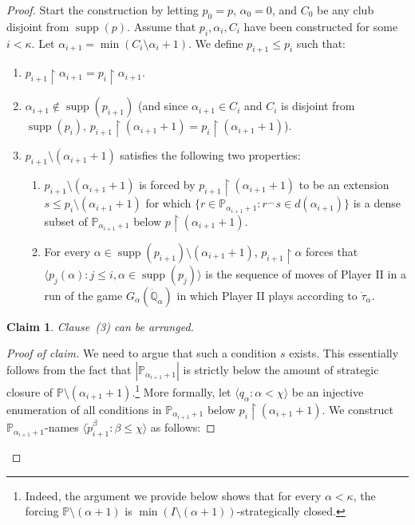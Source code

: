 \documentclass[11pt]{amsart}
\renewcommand{\restriction}{\mathbin\upharpoonright}    %
\newtheorem{claim}{Claim}[theorem]
\theoremstyle{definition}
\newcounter{condition}
\theoremstyle{remark}
\newcommand\<{{<}}
\DeclareMathOperator{\supp}{supp}
\newcommand{\po}{\mathbb{P}}
\newcommand{\qo}{\mathbb{Q}}
\newcommand{\la}{\langle}
\newcommand{\ra}{\rangle}
\begin{document}
\begin{proof}
    Start the construction by letting $p_0 = p$, $\alpha_0 = 0$, and $C_0$ be any club disjoint from $\supp(p)$. Assume that $p_i, \alpha_i, C_i$ have been constructed for some $i<\kappa$. Let $\alpha_{i+1} = \min(C_i \setminus \alpha_i+1)$. We define $p_{i+1}\leq p_i$ such that:
    \begin{enumerate}
        \item $p_{i+1}\restriction \alpha_{i+1} = p_i \restriction \alpha_{i+1}$.
        \item $\alpha_{i+1}\notin \supp(p_{i+1})$ (and since $\alpha_{i+1}\in C_i$ and $C_i$ is disjoint from $\supp(p_i)$,  $p_{i+1}\restriction (\alpha_{i+1}+1) = p_{i}\restriction (\alpha_{i+1}+1)$).
        \item $p_{i+1}\setminus (\alpha_{i+1}+1)$ satisfies the following two properties:
        \begin{enumerate}
            \item $p_{i+1}\setminus (\alpha_{i+1}+1)$ is forced by $p_{i+1}\restriction (\alpha_{i+1}+1)$ to be an  extension $s\leq p_i\setminus (\alpha_{i+1}+1)$ for which $\{ r\in \po_{\alpha_{i+1}+1} \colon  r^{\frown} s\in d(\alpha_{i+1}) \}$ is a dense subset of $\po_{\alpha_{i+1}+1}$ below $p\restriction (\alpha_{i+1}+1)$.
            \item For every $\alpha\in \supp(p_{i+1})\setminus (\alpha_{i+1}+1)$, $p_{i+1}\restriction \alpha$ forces that $\la p_j(\alpha) \colon j\leq i, \alpha\in \supp(p_j) \ra$ is the sequence of moves of Player II in a run of the game $G_\alpha(\dot{\qo}_\alpha)$ in which Player II plays according to $\dot{\tau}_\alpha$.
        \end{enumerate}
    \end{enumerate}
\begin{claim}\label{Claim: fusion lemma, arranging clause 3}
    Clause~(3) can be arranged.
\end{claim}
\begin{proof}[Proof of claim]
   We need to argue that such a condition $s$ exists.  This essentially follows from the fact that $|\po_{\alpha_{i+1}+1}|$ is strictly below the amount of strategic closure of $\po\setminus (\alpha_{i+1}+1)$.\footnote{Indeed, the argument we provide below shows that for every $\alpha<\kappa$, the forcing $\po\setminus (\alpha+1)$ is $ \min(I\setminus (\alpha+1))$-strategically closed.} More formally, let $\langle q_\alpha\colon \alpha<\chi\rangle$ be an injective enumeration of all conditions in $\mathbb{P}_{\alpha_{i+1}+1}$ below $p_i\restriction (\alpha_{i+1}+1)$. We construct $\mathbb{P}_{\alpha_{i+1}+1}$-names $\langle \dot{p}_{i+1}^\beta\colon \beta\leq \chi\rangle$ as follows:

\end{proof}
\end{proof}
\end{document}
